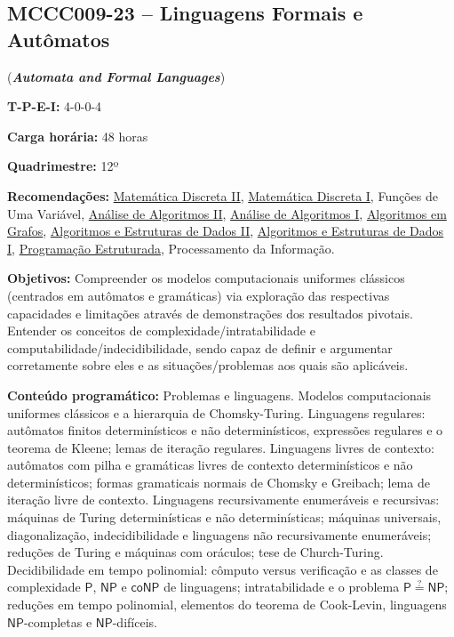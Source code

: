 \documentclass[class=article, crop=false]{standalone}
\begin{document}
\subsection*{MCCC009-23 -- Linguagens Formais e Autômatos}
\label{disc:lfa}

(\textbf{\textit{Automata and Formal Languages}})

\begin{center}
    \begin{minipage}{0.85\textwidth}
        \textbf{T-P-E-I:} 4-0-0-4
        
        \textbf{Carga horária:} 48 horas
        
        \textbf{Quadrimestre:} 12º 
        
        \textbf{Recomendações:} 
        \hyperref[disc:mdII]{Matemática Discreta II},
        \hyperref[disc:mdI]{Matemática Discreta I},
        Funções de Uma Variável,
        \hyperref[disc:aaII]{Análise de Algoritmos II},
        \hyperref[disc:aaI]{Análise de Algoritmos I},
        \hyperref[disc:ag]{Algoritmos em Grafos},
        \hyperref[disc:aedII]{Algoritmos e Estruturas de Dados II},
        \hyperref[disc:aedI]{Algoritmos e Estruturas de Dados I},
        \hyperref[disc:pe]{Programação Estruturada},
        Processamento da Informação.
    \end{minipage}
\end{center}

\textbf{Objetivos:}
Compreender os modelos computacionais uniformes clássicos (centrados em
autômatos e gramáticas) via exploração das respectivas capacidades e limitações
através de demonstrações dos resultados pivotais. 
Entender os conceitos de complexidade/intratabilidade e
computabilidade/indecidibilidade, sendo capaz de definir e argumentar
corretamente sobre eles e as situações/problemas aos quais são aplicáveis.

\textbf{Conteúdo programático:}
Problemas e linguagens.
Modelos computacionais uniformes clássicos e a hierarquia de Chomsky-Turing. 
Linguagens regulares: autômatos finitos determinísticos e não determinísticos,
expressões regulares e o teorema de Kleene; lemas de iteração regulares. 
Linguagens livres de contexto: autômatos com pilha e gramáticas livres de
contexto determinísticos e não determinísticos; formas gramaticais normais de
Chomsky e Greibach; lema de iteração livre de contexto. 
Linguagens recursivamente enumeráveis e recursivas: máquinas de Turing
determinísticas e não determinísticas; máquinas universais, diagonalização,
indecidibilidade e linguagens não recursivamente enumeráveis; reduções de
Turing e máquinas com oráculos; tese de Church-Turing.
Decidibilidade em tempo polinomial: cômputo versus verificação e as classes de
complexidade $\mathsf{P}$, $\mathsf{NP}$ e $\mathsf{coNP}$ de linguagens;
intratabilidade e o problema $\mathsf{P}\stackrel{?}{=}\mathsf{NP}$; reduções
em tempo polinomial, elementos do teorema de Cook-Levin, linguagens
$\mathsf{NP}$-completas e $\mathsf{NP}$-difíceis.
\end{document}
